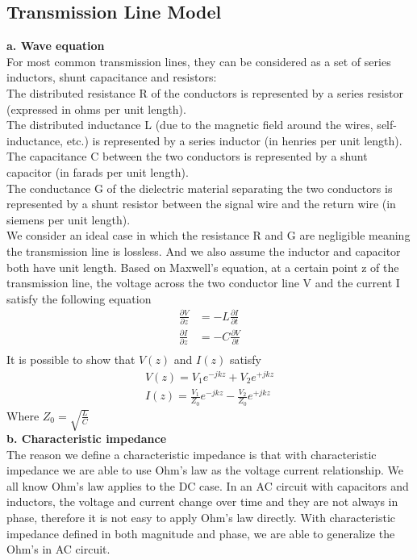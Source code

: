\documentclass[a4paper]{article}
\begin{document}
\subsection{Transmission Line Model}
{\bf a. Wave equation}\\
For most common transmission lines, they can be considered as a set of series inductors, shunt capacitance and resistors:\\
The distributed resistance R of the conductors is represented by a series resistor (expressed in ohms per unit length).\\
The distributed inductance L (due to the magnetic field around the wires, self-inductance, etc.) is represented by a series inductor (in henries per unit length).\\
The capacitance C between the two conductors is represented by a shunt capacitor (in farads per unit length).\\
The conductance G of the dielectric material separating the two conductors is represented by a shunt resistor between the signal wire and the return wire (in siemens per unit length).\\
We consider an ideal case in which the resistance R and G are negligible meaning the transmission line is lossless. And we also assume the inductor and capacitor both have unit length. Based on Maxwell's equation, at a certain point z of the transmission line, the voltage across the two conductor line V and the current I satisfy the following equation
\begin{align*}
	\frac{\partial V}{\partial z} & = -L \frac{\partial I}{\partial t} \\
	\frac{\partial I}{\partial z} & = -C \frac{\partial V}{\partial t} \\
\end{align*}
It is possible to show that $V(z)$ and $I(z)$ satisfy
\begin{align*}
	V(z) = V_1 e^{-jkz} + V_2 e^{+jkz} \\
	I(z) = \frac{V_1}{Z_0} e^{-jkz} - \frac{V_2}{Z_0} e^{+jkz}
\end{align*}
Where $Z_0 = \sqrt{\frac{L}{C}}$\\
{\bf b. Characteristic impedance}\\
The reason we define a characteristic impedance is that with characteristic impedance we are able to use Ohm's law as the voltage current relationship. We all know Ohm's law applies to the DC case. In an AC circuit with capacitors and inductors, the voltage and current change over time and they are not always in phase, therefore it is not easy to apply Ohm's law directly. With characteristic impedance defined in both magnitude and phase, we are able to generalize the Ohm's in AC circuit.\\
\end{document}
